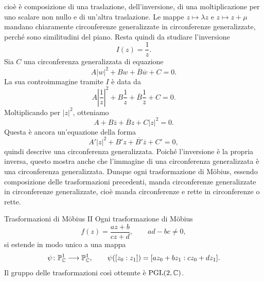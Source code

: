 \documentclass[a4paper]{article}
\begin{document}
\begin{snippetproof}{}
\[    \]
    cioè è composizione di una traslazione, dell'inversione, di una moltiplicazione per uno scalare non nullo e di un'altra traslazione.
    Le mappe \(z\mapsto \lambda z\) e \(z\mapsto z+\mu\) mandano chiaramente circonferenze generalizzate in circonferenze generalizzate, perché sono similitudini del piano. Resta quindi da studiare l'inversione
    \[
        I(z)=\frac1z.
    \]
    Sia \(C\) una circonferenza generalizzata di equazione
    \[
        A|w|^2+Bw+\overline{B}\overline w+C=0.
    \]
    La sua controimmagine tramite \(I\) è data da
    \[
        A\left|\frac1z\right|^2+B\frac1z+\overline{B}\frac1{\overline z}+C=0.
    \]
    Moltiplicando per \(|z|^2\), otteniamo
    \[
        A+B\overline z+\overline{B}z+C|z|^2=0.
    \]
    Questa è ancora un'equazione della forma
    \[
        A'|z|^2+B'z+\overline{B'}\overline z+C'=0,
    \]
    quindi descrive una circonferenza generalizzata. Poiché l'inversione è la propria inversa, questo mostra anche che l'immagine di una circonferenza generalizzata è una circonferenza generalizzata.
    Dunque ogni trasformazione di Möbius, essendo composizione delle trasformazioni precedenti, manda circonferenze generalizzate in circonferenze generalizzate, cioè manda circonferenze e rette in circonferenze o rette.
\end{snippetproof}



\begin{snippetproposition}{Trasformazioni di Möbius II}
    Ogni trasformazione di Möbius
    \[
        f(z)=\frac{az+b}{cz+d},
        \qquad
        ad-bc\neq 0,
    \]
    si estende in modo unico a una mappa
    \[
        \psi\colon \mathbb{P}^1_{\mathbb{C}}\longrightarrow \mathbb{P}^1_{\mathbb{C}},
        \qquad
        \psi([z_0:z_1]) = [az_0+bz_1:cz_0+dz_1].
    \]
    Il gruppo delle trasformazioni così ottenute è \(\operatorname{PGL}(2,\mathbb{C})\).
\end{snippetproposition}
\end{document}
